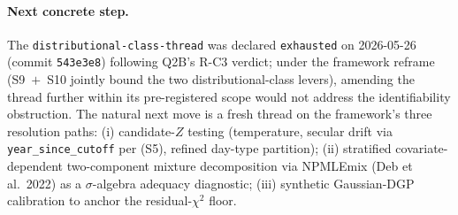 \documentclass[11pt]{article}
\theoremstyle{definition}
\theoremstyle{plain}
\begin{document}
\paragraph{Next concrete step.}
The \texttt{distributional-class-thread} was declared
\texttt{exhausted} on 2026-05-26 (commit \texttt{543e3e8})
following Q2B's R-C3 verdict; under the framework reframe
(S9~$+$~S10 jointly bound the two distributional-class levers),
amending the thread further within its pre-registered scope
would not address the identifiability obstruction. The natural
next move is a fresh thread on the framework's three resolution
paths: (i) candidate-$Z$ testing (temperature, secular drift
via \texttt{year\_since\_cutoff} per (S5), refined day-type
partition); (ii) stratified covariate-dependent two-component
mixture decomposition via NPMLEmix (Deb et al.\ 2022) as a
$\sigma$-algebra adequacy diagnostic; (iii) synthetic Gaussian-DGP
calibration to anchor the residual-$\chi^{2}$ floor.
\end{document}
